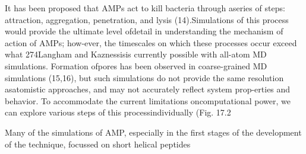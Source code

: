 It has been proposed that AMPs act to kill bacteria through aseries of steps: attraction, aggregation, penetration, and lysis (14).Simulations of this process would provide the ultimate level ofdetail in understanding the mechanism of action of AMPs; how-ever, the timescales on which these processes occur exceed what
274Langham and Kaznessisis currently possible with all-atom MD simulations. Formation ofpores has been observed in coarse-grained MD simulations (15,16), but such simulations do not provide the same resolution asatomistic approaches, and may not accurately reflect system prop-erties and behavior. To accommodate the current limitations oncomputational power, we can explore various steps of this processindividually (Fig. 17.2




Many of the simulations of AMP, especially in the first stages of the development of the technique, focussed on short helical peptides 















